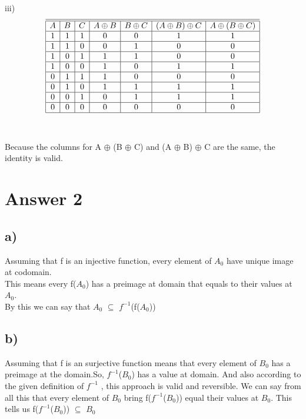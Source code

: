 \documentclass[11pt]{article}
\begin{document}
iii)\\
\begin{displaymath}
\begin{array}{|c|c|c|c|c|c|c|c|}
 \hline

 \hline
A & B & C & A \oplus B & B \oplus C &  (A \oplus B) \oplus C &  A \oplus (B \oplus C)\\
 \hline
 1   & 1  & 1 & 0 & 0 & 1 & 1 \\
 \hline
 1   & 1  & 0 & 0 & 1 & 0 & 0 \\
 \hline
 1   & 0  & 1&  1 & 1 & 0 & 0 \\
 \hline
 1   &0  & 0 & 1 & 0 & 1 &1 \\
 \hline
  0   & 1  & 1 &  1 & 0 & 0 &0 \\
 \hline
  0   & 1  & 0 & 1 & 1 & 1&1 \\
 \hline
 0   & 0  & 1 &  0 & 1 & 1 & 1\\
 \hline
 0   & 0  & 0 &  0 & 0 & 0 & 0 \\
 \hline
\end{array}
\end{displaymath}
\\
\\
Because the columns for A $\oplus$ (B $\oplus$ C) and (A $\oplus$ B) $\oplus$ C are the same, the identity is valid.

\section*{Answer 2}
\subsection*{a)}
Assuming that f is an injective function, every element of $A_0$ have unique image at codomain. \\
This means every f($A_0$) has a preimage at domain that equals to their values at $A_0$. \\ By this we can say that $A_0$ $\subseteq$ $f^{-1}$(f($A_0$))
\subsection*{b)}
Assuming that f is an surjective function means that every element of $B_0$ has a preimage at the domain.So, $f^{-1}$($B_0$) has a value at domain. And also according to the given definition of $f^{-1}$ , this approach is valid and reversible. We can say from all this that every element of $B_0$ bring f($f^{-1}$($B_0$))  equal their values at $B_0$. This tells us f($f^{-1}$($B_0$)) $\subseteq$ $B_0$
\end{document}
